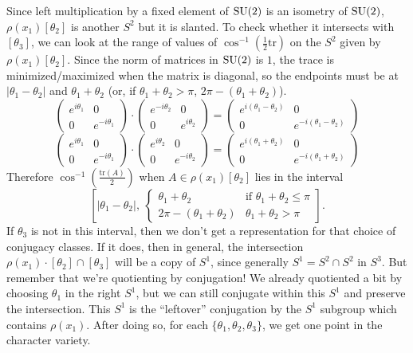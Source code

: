 \documentclass[main]{subfiles}
\begin{document}
Since left multiplication by a fixed element of $\operatorname{SU}(2)$ is an isometry of $\operatorname{SU}(2)$, $\rho(x_1)[\theta_2]$ is another $S^2$ but it is slanted. To check whether it intersects with $[\theta_3]$, we can look at the range of values of $\cos^{-1}(\frac{1}{2}\mathrm{tr})$ on the $S^2$ given by $\rho(x_1)[\theta_2]$. Since the norm of matrices in $\operatorname{SU}(2)$ is $1$, the trace is minimized/maximized when the matrix is diagonal, so the endpoints must be at $|\theta_1-\theta_2|$ and $\theta_1+\theta_2$ (or, if $\theta_1+\theta_2>\pi$, $2\pi-(\theta_1+\theta_2)$).
\[
\begin{pmatrix}e^{i\theta_1}&0\\0&e^{-i\theta_1}\end{pmatrix}\cdot\begin{pmatrix}e^{-i\theta_2}&0\\0&e^{i\theta_2}\end{pmatrix} = \begin{pmatrix}e^{i(\theta_1-\theta_2)}&0\\0&e^{-i(\theta_1-\theta_2)}\end{pmatrix}
\]
\[
\begin{pmatrix}e^{i\theta_1}&0\\0&e^{-i\theta_1}\end{pmatrix}\cdot\begin{pmatrix}e^{i\theta_2}&0\\0&e^{-i\theta_2}\end{pmatrix} = \begin{pmatrix}e^{i(\theta_1+\theta_2)}&0\\0&e^{-i(\theta_1+\theta_2)}\end{pmatrix}
\]
Therefore $\cos^{-1}\left(\frac{\mathrm{tr}(A)}{2}\right)$ when $A\in\rho(x_1)[\theta_2]$ lies in the interval
\[
\left[|\theta_1-\theta_2|,\ \begin{cases}\theta_1+\theta_2 & \text{if } \theta_1+\theta_2\leq\pi\\ 2\pi-(\theta_1+\theta_2) & \theta_1+\theta_2>\pi\end{cases}\right].
\]
If $\theta_3$ is not in this interval, then we don't get a representation for that choice of conjugacy classes. If it does, then in general, the intersection $\rho(x_1)\cdot[\theta_2]\cap[\theta_3]$ will be a copy of $S^1$, since generally $S^1=S^2\cap S^2$ in $S^3$. But remember that we're quotienting by conjugation! We already quotiented a bit by choosing $\theta_1$ in the right $S^1$, but we can still conjugate within this $S^1$ and preserve the intersection. This $S^1$ is the ``leftover'' conjugation by the $S^1$ subgroup which contains $\rho(x_1)$. After doing so, for each $\{\theta_1,\theta_2,\theta_3\}$, we get one point in the character variety.
\end{document}
